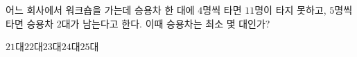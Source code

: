 어느 회사에서 워크숍을 가는데 승용차 한 대에 $4$명씩 타면 $11$명이 타지 못하고, $5$명씩 타면 승용차 $2$대가 남는다고 한다. 이때 승용차는 최소 몇 대인가?
\begin{choices32}{$21$대}{$22$대}{$23$대}{$24$대}{$25$대}\end{choices32}
